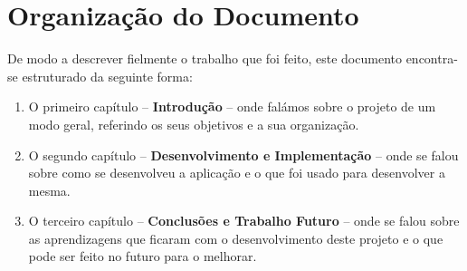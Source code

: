 \section{Organização do Documento}
\label{sec:organ}

De modo a descrever fielmente o trabalho que foi feito, este documento encontra-se estruturado da seguinte forma:

\begin{enumerate}
\item O primeiro capítulo -- \textbf{Introdução} -- onde falámos sobre o projeto de um modo geral, referindo os seus objetivos e a sua organização.
\item O segundo capítulo -- \textbf{Desenvolvimento e Implementação} -- onde se falou sobre como se desenvolveu a aplicação e o que foi usado para desenvolver a mesma.
\item O terceiro capítulo -- \textbf{Conclusões e Trabalho Futuro} -- onde se falou sobre as aprendizagens que ficaram com o desenvolvimento deste projeto e o que pode ser feito no futuro para o melhorar.
\end{enumerate}